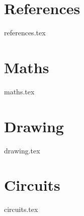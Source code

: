 \documentclass{report}
\begin{document}
\chapter{References}
    {references.tex}
\chapter{Maths}
    {maths.tex}
\chapter{Drawing}
    {drawing.tex}
\chapter{Circuits}
    {circuits.tex}
\end{document}
